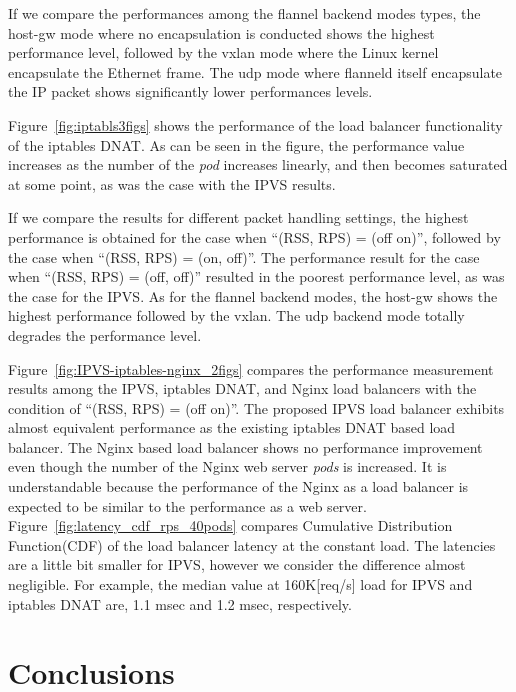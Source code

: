 If we compare the performances among the flannel backend modes types, 
the host-gw mode where no encapsulation is conducted shows the highest performance level,
followed by the vxlan mode where the Linux kernel encapsulate the Ethernet frame.
The udp mode where flanneld itself encapsulate the IP packet shows significantly lower performances levels.

Figure~\ref{fig:iptabls3figs} shows the performance of the load balancer 
functionality of the iptables DNAT. 
As can be seen in the figure, the performance value increases as the number of the {\em pod} increases linearly, 
and then becomes saturated at some point, as was the case with the IPVS results.

If we compare the results for different packet handling settings, the highest performance is 
obtained for the case when \enquote{(RSS, RPS) = (off on)}, followed by the case when \enquote{(RSS, RPS) = (on, off)}. 
The performance result for the case when \enquote{(RSS, RPS) = (off, off)} resulted in the 
poorest performance level, as was the case for the IPVS.
As for the flannel backend modes, the host-gw shows the highest performance followed 
by the vxlan. The udp backend mode totally degrades the performance level.

Figure~\ref{fig:IPVS-iptables-nginx_2figs} compares the performance measurement results 
among the IPVS, iptables DNAT, and Nginx load balancers
with the condition of \enquote{(RSS, RPS) = (off on)}.
The proposed IPVS load balancer exhibits almost equivalent performance as the existing iptables DNAT based load balancer. 
The Nginx based load balancer shows no performance improvement even though the number of the Nginx web server {\em pods} is increased.
It is understandable because the performance of the Nginx as a load balancer is expected to be similar to the performance as a web server.
Figure~\ref{fig:latency_cdf_rps_40pods} compares Cumulative Distribution Function(CDF) of the load balancer latency at the constant load.
The latencies are a little bit smaller for IPVS, however we consider the difference almost negligible.
For example, the median value at 160K[req/s] load for IPVS and iptables DNAT are, 1.1 msec and 1.2 msec, respectively.

\section{Conclusions}\label{Conclusions}

